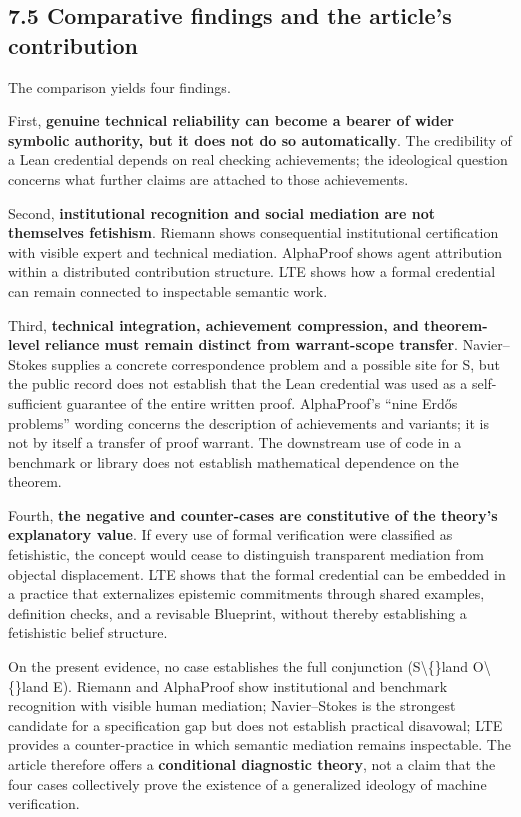 \documentclass[sn-apa]{sn-jnl}
\begin{document}
\subsection{7.5 Comparative findings and the article’s contribution}

The comparison yields four findings.

First, \textbf{genuine technical reliability can become a bearer of wider symbolic authority, but it does not do so automatically}. The credibility of a Lean credential depends on real checking achievements; the ideological question concerns what further claims are attached to those achievements.

Second, \textbf{institutional recognition and social mediation are not themselves fetishism}. Riemann shows consequential institutional certification with visible expert and technical mediation. AlphaProof shows agent attribution within a distributed contribution structure. LTE shows how a formal credential can remain connected to inspectable semantic work.

Third, \textbf{technical integration, achievement compression, and theorem-level reliance must remain distinct from warrant-scope transfer}. Navier–Stokes supplies a concrete correspondence problem and a possible site for S, but the public record does not establish that the Lean credential was used as a self-sufficient guarantee of the entire written proof. AlphaProof’s “nine Erdős problems” wording concerns the description of achievements and variants; it is not by itself a transfer of proof warrant. The downstream use of code in a benchmark or library does not establish mathematical dependence on the theorem.

Fourth, \textbf{the negative and counter-cases are constitutive of the theory’s explanatory value}. If every use of formal verification were classified as fetishistic, the concept would cease to distinguish transparent mediation from objectal displacement. LTE shows that the formal credential can be embedded in a practice that externalizes epistemic commitments through shared examples, definition checks, and a revisable Blueprint, without thereby establishing a fetishistic belief structure.

On the present evidence, no case establishes the full conjunction (S\textbackslash\{\}land O\textbackslash\{\}land E). Riemann and AlphaProof show institutional and benchmark recognition with visible human mediation; Navier–Stokes is the strongest candidate for a specification gap but does not establish practical disavowal; LTE provides a counter-practice in which semantic mediation remains inspectable. The article therefore offers a \textbf{conditional diagnostic theory}, not a claim that the four cases collectively prove the existence of a generalized ideology of machine verification.
\end{document}
